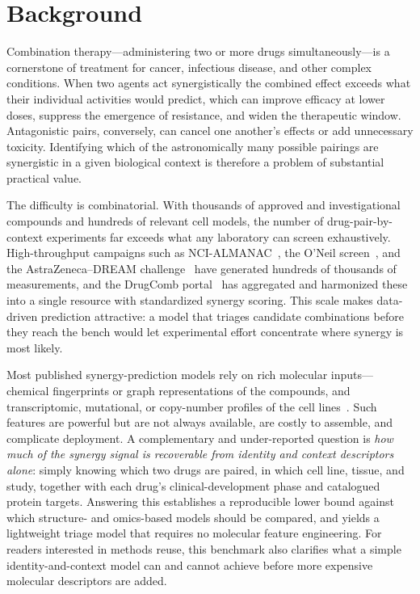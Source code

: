 \documentclass[11pt]{article}
\begin{document}
\section{Background}
Combination therapy---administering two or more drugs simultaneously---is a cornerstone of treatment
for cancer, infectious disease, and other complex conditions. When two agents act synergistically the
combined effect exceeds what their individual activities would predict, which can improve efficacy at
lower doses, suppress the emergence of resistance, and widen the therapeutic window. Antagonistic
pairs, conversely, can cancel one another's effects or add unnecessary toxicity. Identifying which of
the astronomically many possible pairings are synergistic in a given biological context is therefore a
problem of substantial practical value.

The difficulty is combinatorial. With thousands of approved and investigational compounds and
hundreds of relevant cell models, the number of drug-pair-by-context experiments far exceeds what any
laboratory can screen exhaustively. High-throughput campaigns such as NCI-ALMANAC~\cite{holbeck2017},
the O'Neil screen~\cite{oneil2016}, and the AstraZeneca--DREAM challenge~\cite{menden2019} have
generated hundreds of thousands of measurements, and the DrugComb portal~\cite{zagidullin2019,
zheng2021} has aggregated and harmonized these into a single resource with standardized synergy
scoring. This scale makes data-driven prediction attractive: a model that triages candidate
combinations before they reach the bench would let experimental effort concentrate where synergy is
most likely.

Most published synergy-prediction models rely on rich molecular inputs---chemical fingerprints or
graph representations of the compounds, and transcriptomic, mutational, or copy-number profiles of the
cell lines~\cite{preuer2018,menden2019}. Such features are powerful but are not always available, are
costly to assemble, and complicate deployment. A complementary and under-reported question is
\emph{how much of the synergy signal is recoverable from identity and context descriptors alone}:
simply knowing which two drugs are paired, in which cell line, tissue, and study, together with each
drug's clinical-development phase and catalogued protein targets. Answering this establishes a
reproducible lower bound against which structure- and omics-based models should be compared, and
yields a lightweight triage model that requires no molecular feature engineering. For readers
interested in methods reuse, this benchmark also clarifies what a simple identity-and-context
model can and cannot achieve before more expensive molecular descriptors are added.
\end{document}
